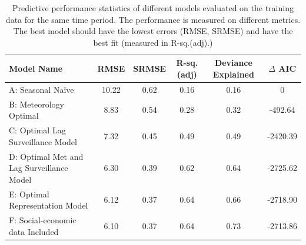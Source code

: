 \documentclass{bmcart}
\begin{document}





\begin{table}
	\centering
	\begin{tabular}{|lccccc|}
		\hline
		\textbf{Model Name} & \textbf{RMSE} & \textbf{SRMSE} & \textbf{R-sq.(adj)} & \textbf{Deviance Explained} & \textbf{$\Delta$ AIC} \\ 
		\hline
		A: Seasonal Na\"{i}ve  & 10.22 & 0.62 & 0.16 & 0.16 & 0\\ 
		B: Meteorology Optimal & 8.83 & 0.54 & 0.28 & 0.32 & -492.64\\ 
		C: Optimal Lag Surveillance Model  &  7.32 & 0.45 & 0.49 & 0.49 & -2420.39 \\ 
		D: Optimal Met and Lag Surveillance Model  & 6.30 & 0.39 & 0.62 & 0.64 &  -2725.62\\ 
		E: Optimal Representation Model & 6.12 & 0.37 & 0.64 & 0.66 & -2718.90\\ 
		F: Social-economic data Included & 6.10 & 0.37 & 0.64 & 0.73 & -2713.86 \\ 
		\hline
	\end{tabular}
	\caption{Predictive performance statistics of different models evaluated on the training data for the same time period. The performance is measured on different metrics. The best model should have the lowest errors (RMSE, SRMSE) and have the best fit (measured in R-sq.(adj).) }
	\label{resultsPrediction}
\end{table}
\end{document}
